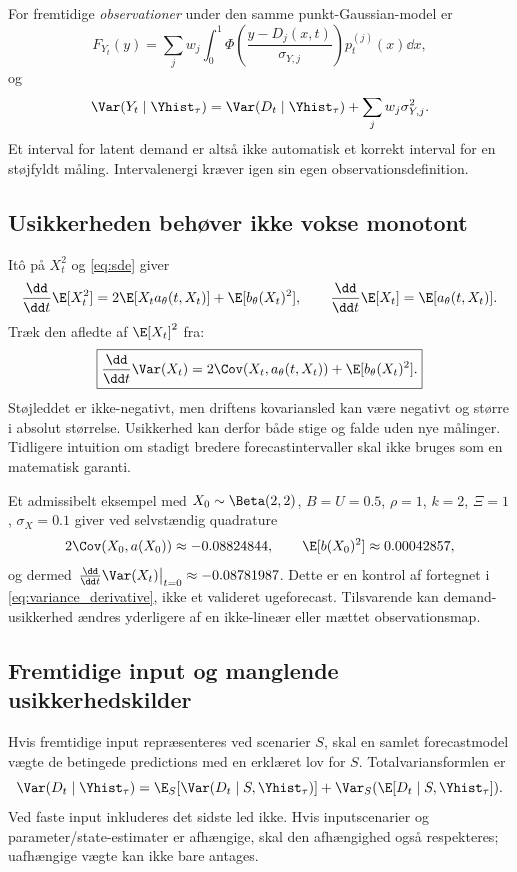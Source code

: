 For fremtidige \emph{observationer} under den samme punkt-Gaussian-model er
\begin{equation}
 F_{Y_t}(y)=\sum_jw_j\int_0^1
 \Phi\!\left(\frac{y-D_j(x,t)}{\sigma_{Y,j}}\right)p_t^{(j)}(x)\dd x,
 \label{eq:observationcdf}
\end{equation}
og
\begin{equation}
 \Var(Y_t\mid\Yhist_\tau)=\Var(D_t\mid\Yhist_\tau)+\sum_jw_j\sigma_{Y,j}^2.
 \label{eq:observedvariance}
\end{equation}
Et interval for latent demand er altså ikke automatisk et korrekt interval for en støjfyldt måling. Intervalenergi kræver igen sin egen observationsdefinition.

\subsection{Usikkerheden behøver ikke vokse monotont}
Itô på \(X_t^2\) og \eqref{eq:sde} giver
\[
 \frac{\dd}{\dd t}\E[X_t^2]=2\E[X_ta_\theta(t,X_t)]+\E[b_\theta(X_t)^2],
 \qquad \frac{\dd}{\dd t}\E[X_t]=\E[a_\theta(t,X_t)].
\]
Træk den afledte af \(\E[X_t]^2\) fra:
\begin{equation}
 \boxed{\frac{\dd}{\dd t}\Var(X_t)
 =2\Cov(X_t,a_\theta(t,X_t))+\E[b_\theta(X_t)^2].}
 \label{eq:variance_derivative}
\end{equation}
Støjleddet er ikke-negativt, men driftens kovariansled kan være negativt og større i absolut størrelse. Usikkerhed kan derfor både stige og falde uden nye målinger. Tidligere intuition om stadigt bredere forecastintervaller skal ikke bruges som en matematisk garanti.

Et admissibelt eksempel med \(X_0\sim\Beta(2,2)\), \(B=U=0.5\), \(\rho=1\), \(k=2\), \(\Xi=1\), \(\sigma_X=0.1\) giver ved selvstændig quadrature
\[
 2\Cov(X_0,a(X_0))\approx-0.08824844,\qquad
 \E[b(X_0)^2]\approx0.00042857,
\]
og dermed \(\left.\frac{\dd}{\dd t}\Var(X_t)\right|_{t=0}\approx-0.08781987\).
Dette er en kontrol af fortegnet i \eqref{eq:variance_derivative}, ikke et valideret ugeforecast. Tilsvarende kan demand-usikkerhed ændres yderligere af en ikke-lineær eller mættet observationsmap.

\subsection{Fremtidige input og manglende usikkerhedskilder}
Hvis fremtidige input repræsenteres ved scenarier \(S\), skal en samlet forecastmodel vægte de betingede predictions med en erklæret lov for \(S\). Totalvariansformlen er
\begin{equation}
 \Var(D_t\mid\Yhist_\tau)
 =\E_S[\Var(D_t\mid S,\Yhist_\tau)]
  +\Var_S(\E[D_t\mid S,\Yhist_\tau]).
 \label{eq:inputuncertainty}
\end{equation}
Ved faste input inkluderes det sidste led ikke. Hvis inputscenarier og parameter/state-estimater er afhængige, skal den afhængighed også respekteres; uafhængige vægte kan ikke bare antages.

